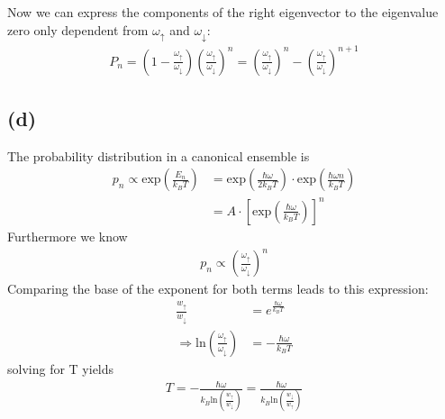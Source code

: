 \documentclass{article}
\begin{document}
Now we can express the components of the right eigenvector to the eigenvalue zero only dependent from $\omega_\uparrow$ and $\omega_\downarrow$:
\begin{align*}
    P_n= \left(1-\frac{\omega_\uparrow}{\omega_\downarrow}\right)\left(\frac{\omega_\uparrow}{\omega_\downarrow}\right)^n= \left(\frac{\omega_\uparrow}{\omega_\downarrow}\right)^n-\left(\frac{\omega_\uparrow}{\omega_\downarrow}\right)^{n+1}
\end{align*}

\subsection*{(d)}
The probability distribution in a canonical ensemble is 
\begin{align*}
    p_n \propto \text{exp}\left(\frac{E_n}{k_B T}\right) &= \text{exp}\left(\frac{\hbar \omega }{2k_B T}\right)\cdot \text{exp}\left(\frac{\hbar \omega n}{k_B T}\right)\\
    &=A\cdot \left[\text{exp}\left(\frac{\hbar \omega}{k_B T}\right)\right]^n
\end{align*}
Furthermore we know
\begin{align*}
    p_n\propto\left(\frac{\omega_\uparrow}{\omega_\downarrow}\right)^n
\end{align*}
Comparing the base of the exponent for both terms leads to this expression: 
\begin{align}
        \frac{w_\uparrow}{w_\downarrow} &= e^{\frac{\hbar \omega}{k_B T}}\\
        \Rightarrow \text{ln}\left(\frac{\omega_\uparrow}{\omega_\downarrow}\right)&=-\frac{\hbar\omega}{k_BT}
\end{align}
solving for T yields
\begin{align}
    T = -\frac{\hbar \omega}{k_B \text{ln}\left({\frac{w_\uparrow}{w_\downarrow}}\right)}=\frac{\hbar \omega}{k_B \text{ln}\left({\frac{w_\downarrow}{w_\uparrow}}\right)}
\end{align}
\end{document}

